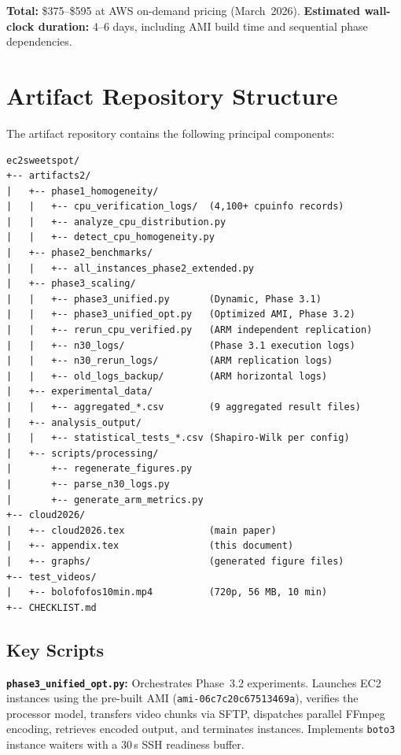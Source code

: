 \documentclass[conference]{IEEEtran}
\begin{document}
\noindent
\textbf{Total:} \$375--\$595 at AWS on-demand pricing (March~2026).
\textbf{Estimated wall-clock duration:} 4--6 days, including AMI build time
and sequential phase dependencies.

\section{Artifact Repository Structure}
\label{app:structure}

The artifact repository contains the following principal components:

\begin{verbatim}
ec2sweetspot/
+-- artifacts2/
|   +-- phase1_homogeneity/
|   |   +-- cpu_verification_logs/  (4,100+ cpuinfo records)
|   |   +-- analyze_cpu_distribution.py
|   |   +-- detect_cpu_homogeneity.py
|   +-- phase2_benchmarks/
|   |   +-- all_instances_phase2_extended.py
|   +-- phase3_scaling/
|   |   +-- phase3_unified.py       (Dynamic, Phase 3.1)
|   |   +-- phase3_unified_opt.py   (Optimized AMI, Phase 3.2)
|   |   +-- rerun_cpu_verified.py   (ARM independent replication)
|   |   +-- n30_logs/               (Phase 3.1 execution logs)
|   |   +-- n30_rerun_logs/         (ARM replication logs)
|   |   +-- old_logs_backup/        (ARM horizontal logs)
|   +-- experimental_data/
|   |   +-- aggregated_*.csv        (9 aggregated result files)
|   +-- analysis_output/
|   |   +-- statistical_tests_*.csv (Shapiro-Wilk per config)
|   +-- scripts/processing/
|       +-- regenerate_figures.py
|       +-- parse_n30_logs.py
|       +-- generate_arm_metrics.py
+-- cloud2026/
|   +-- cloud2026.tex               (main paper)
|   +-- appendix.tex                (this document)
|   +-- graphs/                     (generated figure files)
+-- test_videos/
|   +-- bolofofos10min.mp4          (720p, 56 MB, 10 min)
+-- CHECKLIST.md
\end{verbatim}

\subsection{Key Scripts}

\textbf{\texttt{phase3\_unified\_opt.py}:}
Orchestrates Phase~3.2 experiments. Launches EC2 instances using the pre-built
AMI (\texttt{ami-06c7c20c67513469a}), verifies the processor model, transfers
video chunks via SFTP, dispatches parallel FFmpeg encoding, retrieves encoded
output, and terminates instances. Implements \texttt{boto3} instance waiters
with a 30\,s SSH readiness buffer.
\end{document}
